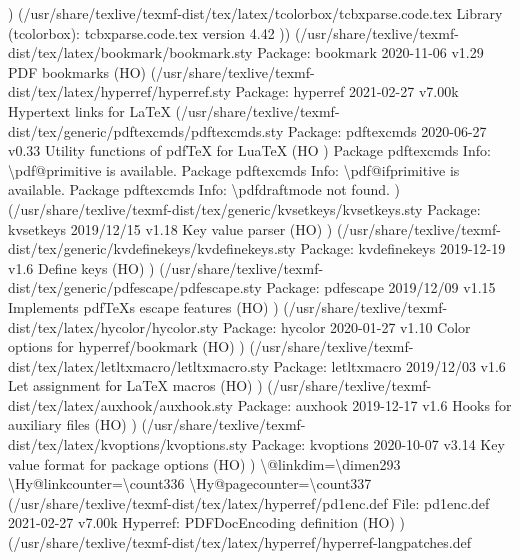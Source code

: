 \documentclass[
  letterpaper,
  DIV=11,
  numbers=noendperiod]{scrartcl}
\newenvironment{Shaded}{\begin{snugshade}}{\end{snugshade}}
\newcommand{\NormalTok}[1]{\textcolor[rgb]{0.00,0.23,0.31}{#1}}
\begin{document}
\begin{Shaded}
\begin{Highlighting}[]
\NormalTok{) (/usr/share/texlive/texmf{-}dist/tex/latex/tcolorbox/tcbxparse.code.tex}
\NormalTok{Library (tcolorbox): \textquotesingle{}tcbxparse.code.tex\textquotesingle{} version \textquotesingle{}4.42\textquotesingle{}}
\NormalTok{)) (/usr/share/texlive/texmf{-}dist/tex/latex/bookmark/bookmark.sty}
\NormalTok{Package: bookmark 2020{-}11{-}06 v1.29 PDF bookmarks (HO)}
\NormalTok{(/usr/share/texlive/texmf{-}dist/tex/latex/hyperref/hyperref.sty}
\NormalTok{Package: hyperref 2021{-}02{-}27 v7.00k Hypertext links for LaTeX}
\NormalTok{(/usr/share/texlive/texmf{-}dist/tex/generic/pdftexcmds/pdftexcmds.sty}
\NormalTok{Package: pdftexcmds 2020{-}06{-}27 v0.33 Utility functions of pdfTeX for LuaTeX (HO}
\NormalTok{)}
\NormalTok{Package pdftexcmds Info: \textbackslash{}pdf@primitive is available.}
\NormalTok{Package pdftexcmds Info: \textbackslash{}pdf@ifprimitive is available.}
\NormalTok{Package pdftexcmds Info: \textbackslash{}pdfdraftmode not found.}
\NormalTok{) (/usr/share/texlive/texmf{-}dist/tex/generic/kvsetkeys/kvsetkeys.sty}
\NormalTok{Package: kvsetkeys 2019/12/15 v1.18 Key value parser (HO)}
\NormalTok{) (/usr/share/texlive/texmf{-}dist/tex/generic/kvdefinekeys/kvdefinekeys.sty}
\NormalTok{Package: kvdefinekeys 2019{-}12{-}19 v1.6 Define keys (HO)}
\NormalTok{) (/usr/share/texlive/texmf{-}dist/tex/generic/pdfescape/pdfescape.sty}
\NormalTok{Package: pdfescape 2019/12/09 v1.15 Implements pdfTeX\textquotesingle{}s escape features (HO)}
\NormalTok{) (/usr/share/texlive/texmf{-}dist/tex/latex/hycolor/hycolor.sty}
\NormalTok{Package: hycolor 2020{-}01{-}27 v1.10 Color options for hyperref/bookmark (HO)}
\NormalTok{) (/usr/share/texlive/texmf{-}dist/tex/latex/letltxmacro/letltxmacro.sty}
\NormalTok{Package: letltxmacro 2019/12/03 v1.6 Let assignment for LaTeX macros (HO)}
\NormalTok{) (/usr/share/texlive/texmf{-}dist/tex/latex/auxhook/auxhook.sty}
\NormalTok{Package: auxhook 2019{-}12{-}17 v1.6 Hooks for auxiliary files (HO)}
\NormalTok{) (/usr/share/texlive/texmf{-}dist/tex/latex/kvoptions/kvoptions.sty}
\NormalTok{Package: kvoptions 2020{-}10{-}07 v3.14 Key value format for package options (HO)}
\NormalTok{)}
\NormalTok{\textbackslash{}@linkdim=\textbackslash{}dimen293}
\NormalTok{\textbackslash{}Hy@linkcounter=\textbackslash{}count336}
\NormalTok{\textbackslash{}Hy@pagecounter=\textbackslash{}count337}
\NormalTok{(/usr/share/texlive/texmf{-}dist/tex/latex/hyperref/pd1enc.def}
\NormalTok{File: pd1enc.def 2021{-}02{-}27 v7.00k Hyperref: PDFDocEncoding definition (HO)}
\NormalTok{) (/usr/share/texlive/texmf{-}dist/tex/latex/hyperref/hyperref{-}langpatches.def}

\end{Highlighting}
\end{Shaded}
\end{document}
